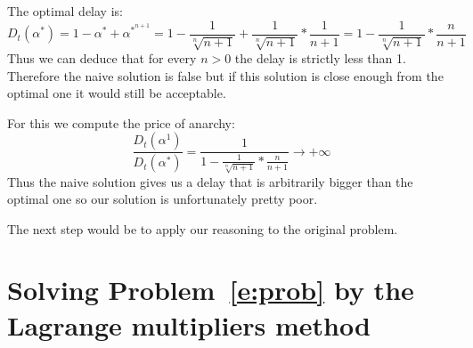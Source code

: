 The optimal delay is: $$D_t(\alpha ^*) = 1 - \alpha ^* + \alpha ^{*^{n+1}} = 1 - \frac{1}{{\sqrt[n]{n+1}}} + \frac{1}{{\sqrt[n]{n+1}}} * \frac{1}{n+1} = 1 - \frac{1}{{\sqrt[n]{n+1}}} * \frac{n}{n+1}$$ Thus we can deduce that for every $ n > 0$ the delay is strictly less than 1. Therefore the naive solution is false but if this solution is close enough from the optimal one it would still be acceptable.

For this we compute the price of anarchy: $$ \frac{D_t(\alpha ^1)}{D_t(\alpha ^*)} = \frac{1}{1 - \frac{1}{{\sqrt[n]{n+1}}} * \frac{n}{n+1}} \rightarrow +\infty$$ Thus the naive solution gives us a delay that is arbitrarily bigger than the optimal one so our solution is unfortunately pretty poor.

The next step would be to apply our reasoning to the original problem.

\section{Solving Problem~\eqref{e:prob} by the Lagrange multipliers method}

